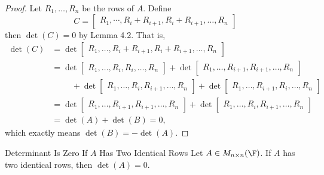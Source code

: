 \documentclass[linearalgebraI]{subfiles}
\begin{document}
    \begin{proof}
        Let $R_1, \ldots, R_n$ be the rows of $A$. Define
        \begin{equation*}
            C =
            \begin{bmatrix}
                R_1, \cdots, R_i+R_{i+1}, R_i+R_{i+1}, \ldots, R_n
            \end{bmatrix}
        \end{equation*}
        then $\det(C) = 0$ by Lemma 4.2. That is,
        \begin{align*}
            \det(C) & = \det 
            \begin{bmatrix}
                R_1, \ldots, R_i+R_{i+1}, R_i+R_{i+1}, \ldots, R_n
            \end{bmatrix} \\
                    & = \det 
            \begin{bmatrix}
                R_1, \ldots, R_i, R_i, \ldots, R_n
            \end{bmatrix}
            + \det 
            \begin{bmatrix}
                R_1, \ldots, R_{i+1}, R_{i+1}, \ldots, R_n
            \end{bmatrix} \\
                    & \hspace{1cm} + \det 
            \begin{bmatrix}
                R_1, \ldots, R_i, R_{i+1}, \ldots, R_n    
            \end{bmatrix}
            + \det 
            \begin{bmatrix}
                R_1, \ldots, R_{i+1}, R_i, \ldots, R_n
            \end{bmatrix} \\
            & = \det
            \begin{bmatrix}
                R_1, \ldots, R_{i+1}, R_{i+1}, \ldots, R_n
            \end{bmatrix} 
            + \det
            \begin{bmatrix}
                R_1, \ldots, R_i, R_{i+1}, \ldots, R_n    
            \end{bmatrix} \\
            & = 
            \det(A) + \det(B) = 0,
        \end{align*} 
        which exactly means $\det(B) = -\det(A)$.
    \end{proof}

    \begin{lemma}{Determinant Is Zero If $A$ Has Two Identical Rows}
        Let $A\in M_{n\times n}(\F)$. If $A$ has two identical rows, then $\det(A) = 0$.
    \end{lemma}
\end{document}
